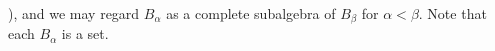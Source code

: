 ), and we may regard $B_\alpha$ as a complete subalgebra of $B_\beta$ for $\alpha < \beta$. Note that each $B_\alpha$ is a set.
